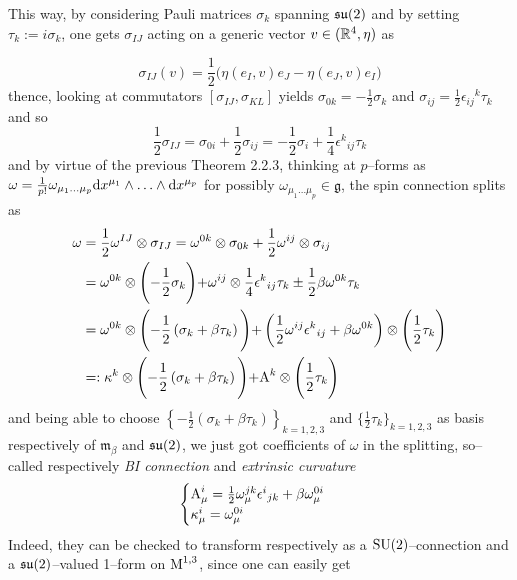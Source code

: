 This way, by considering Pauli matrices $\sigma_k$ spanning $\mathfrak{su}(2)$ and by setting $\tau_k:=i\sigma_k$, one gets $\sigma_{IJ}$ acting on a generic vector $v\in(\mathbb{R}^{4},\eta)$ as

$$\sigma_{IJ}(v)=\frac{1}{2}\bigg(\eta(e_I,v)e_J-\eta(e_J,v)e_I\bigg)$$
thence, looking at commutators $[\sigma_{IJ},\sigma_{KL}]$ yields $\sigma_{0k}=-\frac{1}{2}\sigma_k$ and $\sigma_{ij}=\frac{1}{2}{\epsilon_{ij}}^k\tau_k$ and so
$$\frac{1}{2}\sigma_{IJ}=\sigma_{0i}+\frac{1}{2}\sigma_{ij}=-\frac{1}{2}\sigma_i+\frac{1}{4}{\epsilon^k}_{ij}\tau_k$$
and by virtue of the previous Theorem 2.2.3, thinking at $p$--forms as $\omega=\frac{1}{p!}\omega_{\mu_1\hdots\mu_p}\text{\normalfont d} x^{\mu_1}\wedge\hdots\wedge\text{\normalfont d} x^{\mu_p}$ for possibly $\omega_{\mu_1\hdots\mu_p}\in\mathfrak{g}$, the spin connection splits as
\begin{align*}
    \omega&=\frac{1}{2}\omega^{IJ}\otimes\sigma_{IJ}=\omega^{0k}\otimes\sigma_{0k}+\frac{1}{2}\omega^{ij}\otimes\sigma_{ij}\\
    &=\omega^{0k}\otimes\Biggl(-\frac{1}{2}\sigma_k\Biggl)+\omega^{ij}\otimes\frac{1}{4}{\epsilon^k}_{ij}\tau_k\pm\frac{1}{2}\beta\omega^{0k}\tau_k\\
    &=\omega^{0k}\otimes\Biggl(-\frac{1}{2}\left(\sigma_k+\beta\tau_k\right)\Biggl)+\left(\frac{1}{2}\omega^{ij}{\epsilon^k}_{ij}+\beta\omega^{0k}\right)\otimes\Biggl(\frac{1}{2}\tau_k\Biggl)\\
    &=:\kappa^k\otimes\Biggl(-\frac{1}{2}\left(\sigma_k+\beta\tau_k\right)\Biggl)+\text{\normalfont A}^k\otimes\Biggl(\frac{1}{2}\tau_k\Biggl)
\end{align*}
and being able to choose $\left\{-\frac{1}{2}\left(\sigma_k+\beta\tau_k\right)\right\}_{k=1,2,3}$ and $\{\frac{1}{2}\tau_k\}_{k=1,2,3}$ as basis respectively of $\mathfrak{m}_\beta$ and $\mathfrak{su}(2)$, we just got coefficients of $\omega$ in the splitting, so--called respectively \emph{BI connection} and \emph{extrinsic curvature}
\,\newline
\begin{equation}\label{BI_conn}
    \begin{cases}
        \text{\normalfont A}^i_\mu=\frac{1}{2}\omega^{jk}_\mu{\epsilon^i}_{jk}+\beta\omega^{0i}_\mu\\
        \kappa^i_\mu=\omega^{0i}_\mu
    \end{cases}
\end{equation}
Indeed, they can be checked to transform respectively as a $\text{\normalfont SU}(2)$--connection and a $\mathfrak{su}(2)$--valued 1--form on $\text{\normalfont M}^{1,3}$, since one can easily get

